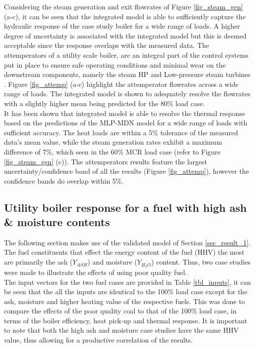 \documentclass[a4paper,fleqn]{cas-sc}
\begin{document}
Considering the steam generation and exit flowrates of Figure \ref{fig_steam_gen} (a-c), it can be seen that the integrated model is able to sufficiently capture the hydraulic response of the case study boiler for a wide range of loads. A higher degree of uncertainty is associated with the integrated model but this is deemed acceptable since the response overlaps with the measured data. The attemperators of a utility scale boiler, are an integral part of the control systems put in place to ensure safe operating conditions and minimal wear on the downstream components, namely the steam HP and Low-pressure steam turbines \cite{Kakac1991}. Figure  \ref{fig_attemp} (a-c) highlight the attemperator flowrates across a wide range of loads. The integrated model is shown to adequately resolve the flowrates with a slightly higher mean being predicted for the 80\% load case.\\

It has been shown that integrated model is able to resolve the thermal response based on the predictions of the MLP-MDN model for a wide range of loads with sufficient accuracy. The heat loads are within a 5\% tolerance of the measured data's mean value, while the steam generation rates exhibit a maximum difference of 7\%, which seen in the 60\% MCR load case (refer to Figure \ref{fig_steam_gen} (c)). The attemperators results feature the largest uncertainty/confidence band of all the results (Figure \ref{fig_attemp}), however the confidence bands do overlap within 5\%. 
\subsection{Utility boiler response for a fuel with high ash \& moisture contents}
The following section makes use of the validated model of Section \ref{sec_result_1}. The fuel constituents that effect the energy content of the fuel (HHV) the most are primarily the ash ($Y_{ASH}$) and moisture ($Y_{H_{2}O}$) content. Thus, two case studies were made to illustrate the effects of using poor quality fuel.\\

The input vectors for the two fuel cases are provided in Table \ref{tbl_inputs}, it can be seen that the all the inputs are identical to the 100\% load case except for the ash, moisture and higher heating value of the respective fuels. This was done to compare the effects of the poor quality coal to that of the 100\% load case, in terms of the boiler efficiency, heat pick-up and thermal response. It is important to note that both the high ash and moisture case studies have the same HHV value, thus allowing for a productive correlation of the results.\\
\end{document}
